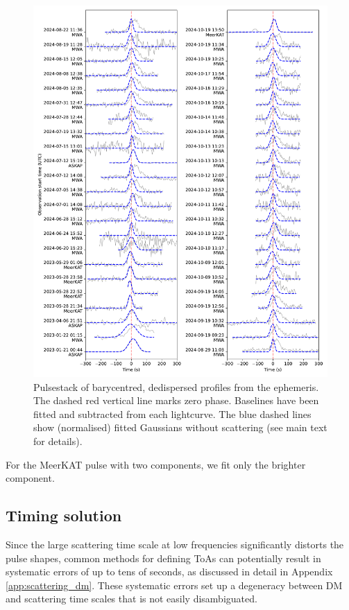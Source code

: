 \documentclass[fleqn,usenatbib]{mnras}
\begin{document}
\begin{figure}[tp]
      \centering
          \includegraphics[width=0.95\linewidth]{pulsestack.pdf}
              \caption{Pulsestack of barycentred, dedispersed profiles from the ephemeris. The dashed red vertical line marks zero phase. Baselines have been fitted and subtracted from each lightcurve. The blue dashed lines show (normalised) fitted Gaussians without scattering (see main text for details).}
                  \label{fig:pulsestack}
\end{figure}

For the MeerKAT pulse with two components, we fit only the brighter component.

\subsection{Timing solution} \label{sec:timing}

Since the large scattering time scale at low frequencies significantly distorts the pulse shapes, common methods for defining ToAs can potentially result in systematic errors of up to tens of seconds, as discussed in detail in Appendix \ref{app:scattering_dm}.
These systematic errors set up a degeneracy between DM and scattering time scales that is not easily disambiguated.
\end{document}

